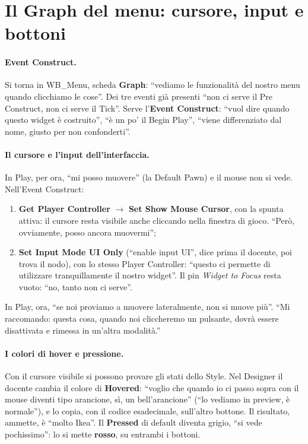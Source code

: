 \section{Il Graph del menu: cursore, input e bottoni}
\label{ue12:sec:menugraph}

\paragraph{Event Construct.} Si torna in WB\_Menu, scheda \textbf{Graph}: ``vediamo le
funzionalità del nostro menu quando clicchiamo le cose''. Dei tre eventi già presenti
``non ci serve il Pre Construct, non ci serve il Tick''. Serve l'\textbf{Event Construct}:
``vuol dire quando questo widget è costruito'', ``è un po' il Begin Play'', ``viene
differenziato dal nome, giusto per non confonderti''.

\paragraph{Il cursore e l'input dell'interfaccia.} In Play, per ora, ``mi posso muovere''
(la Default Pawn) e il mouse non si vede. Nell'Event Construct:
\begin{enumerate}
  \item \textbf{Get Player Controller} $\rightarrow$ \textbf{Set Show Mouse Cursor},
        con la spunta attiva: il cursore resta visibile anche cliccando nella finestra di
        gioco. ``Però, ovviamente, posso ancora muovermi'';
  \item \textbf{Set Input Mode UI Only} (``enable input UI'', dice prima il docente, poi
        trova il nodo), con lo stesso Player Controller: ``questo ci permette di
        utilizzare tranquillamente il nostro widget''. Il pin \emph{Widget to Focus} resta
        vuoto: ``no, tanto non ci serve''.
\end{enumerate}
In Play, ora, ``se noi proviamo a muovere lateralmente, non si muove più''. ``Mi
raccomando: questa cosa, quando noi cliccheremo un pulsante, dovrà essere disattivata e
rimessa in un'altra modalità.''

\paragraph{I colori di hover e pressione.} Con il cursore visibile si possono provare gli
stati dello Style. Nel Designer il docente cambia il colore di \textbf{Hovered}: ``voglio
che quando io ci passo sopra con il mouse diventi tipo arancione, sì, un bell'arancione''
(``lo vediamo in preview, è normale''), e lo copia, con il codice esadecimale, sull'altro
bottone. Il risultato, ammette, è ``molto Ikea''. Il \textbf{Pressed} di default diventa
grigio, ``si vede pochissimo'': lo si mette \textbf{rosso}, su entrambi i bottoni.

